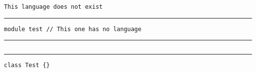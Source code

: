 \documentclass{minimal}
\newcommand{\separate}{\vspace{1em}\hrule\vspace{1em}}
\begin{document}
\begin{verbatim}
This language does not exist
\end{verbatim}

\separate

\begin{verbatim}
module test // This one has no language
\end{verbatim}

\separate

\inputminted[firstline=26]{spoofax_lexer.py -O "parseTable=dnx.tbl,esv=dnx.editor.esv.af" -x}{test.dnx}

\separate

\begin{verbatim}
class Test {}
\end{verbatim}
\end{document}

